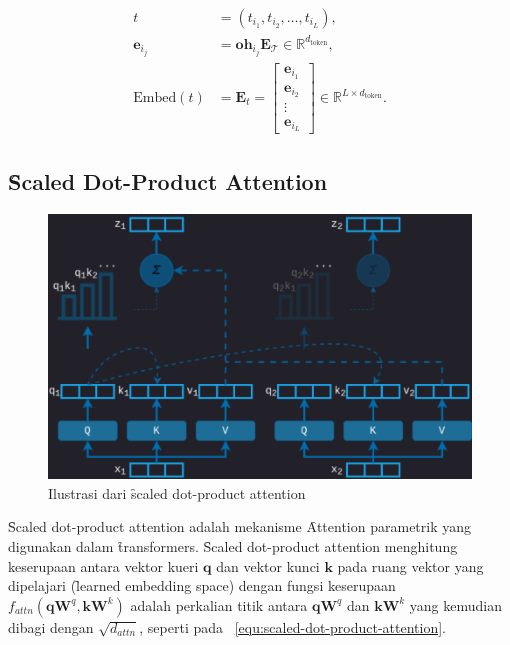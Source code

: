 	\begin{align}
		\label{equ:token-embedding-start}
		t &= (t_{i_1}, t_{i_2}, \dots, t_{i_L}), \\
		\mathbf{e}_{i_j} &= \mathbf{oh}_{i_j} \mathbf{E}_{\mathcal{T}} \in \mathbb{R}^{d_{\text{token}}}, \\
		\label{equ:token-embedding-end}
		\text{Embed}(t) &= \mathbf{E}_{t} = \begin{bmatrix}
			\mathbf{e}_{i_1} \\
			\mathbf{e}_{i_2} \\
			\vdots \\
			\mathbf{e}_{i_L}
		\end{bmatrix} \in \mathbb{R}^{L \times d_{\text{token}}}.
	\end{align}

	\subsection{\f{Scaled Dot-Product Attention}}
	\label{sec:scaled-dot-product-attention}

	\begin{figure}
		\centering
		\includegraphics[width=1\textwidth]{assets/pics/scaled-dot-product-attention.png}
		\caption{Ilustrasi dari \f{scaled dot-product attention} \citep{pi-tau2023transformer}}
		\label{fig:scaled-dot-product-attention}
	\end{figure}

	\f{Scaled dot-product attention} adalah mekanisme \f{Attention} parametrik yang digunakan dalam \f{transformers}. \f{Scaled dot-product attention} menghitung keserupaan antara vektor kueri $\mathbf{q}$ dan vektor kunci $\mathbf{k}$ pada ruang vektor yang dipelajari (\f{learned embedding space}) dengan fungsi keserupaan $f_{attn}(\mathbf{q} \mathbf{W}^q, \mathbf{k}\mathbf{W}^k) $ adalah perkalian titik antara $\mathbf{qW}^q$ dan $\mathbf{kW}^k$ yang kemudian dibagi dengan $\sqrt{d_{attn}}$, seperti pada \equ~\ref{equ:scaled-dot-product-attention}.

